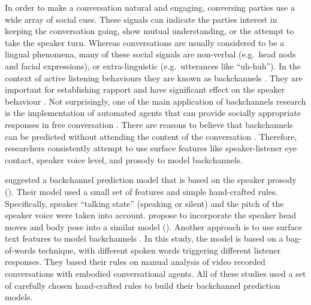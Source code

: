 \documentclass[]{simple-thesis}
\begin{document}
In order to make a conversation natural and engaging, conversing parties use a wide array of social cues.
These signals can indicate the parties interest in keeping the conversation going, show mutual understanding, or the attempt to take the speaker turn.
Whereas conversations are usually considered to be a lingual phenomena, many of these social signals are non-verbal (e.g.\ head nods and facial expressions), or extra-linguistic (e.g.\ utterances like ``uh-huh'').
In the context of active listening behaviours they are known as backchannels \citep{Yngve1970}.
They are important for establishing rapport \citep{Gratch2007} and have significant effect on the speaker behaviour \citep{Bavelas2000}.
Not surprisingly, one of the main application of backchannels research is the implementation of automated agents that can provide socially appropriate responses in free conversation \citep{Morency2008, Bevacqua2008}.
There are reasons to believe that backchannels can be predicted without attending the content of the conversation \citep{Yngve1970}.
Therefore, researchers consistently attempt to use surface features like speaker-listener eye contact, speaker voice level, and prosody to model backchannels.

\citeauthor{Ward2000} suggested a backchannel prediction model that is based on the speaker prosody (\citeyear{Ward2000}).
Their model used a small set of features and simple hand-crafted rules.
Specifically, speaker ``talking state'' (speaking or silent) and the pitch of the speaker voice were taken into account.
\citeauthor{Gratch2006} propose to incorporate the speaker head moves and body pose into a similar model (\citeyear{Gratch2006}).
Another approach is to use surface text features to model backchannels \citep{Lee2006}.
In this study, the model is based on a bag-of-words technique, with different spoken words triggering different listener responses.
They based their rules on manual analysis of video recorded conversations with embodied conversational agents.
All of these studies used a set of carefully chosen hand-crafted rules to build their backchannel prediction models.
\end{document}
